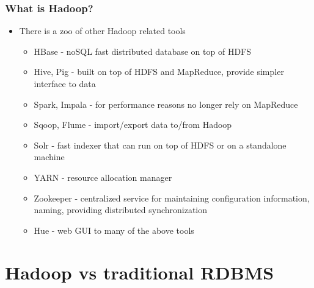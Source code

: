 \documentclass{beamer}
\begin{document}
\begin{frame}
  \frametitle{What is Hadoop?}
  \begin{itemize}
  \item There is a zoo of other Hadoop related tools
    \begin{itemize}
    \item {\color{mycolordef}HBase} - noSQL fast distributed database on top of HDFS
    \item {\color{mycolordef}Hive, Pig}  -  built on top of HDFS and MapReduce, provide simpler interface to data
    \item {\color{mycolordef}Spark, Impala} - for performance reasons no longer rely on MapReduce
    \item {\color{mycolordef}Sqoop, Flume} - import/export data to/from Hadoop
    \item {\color{mycolordef}Solr} - fast indexer that can run on top of HDFS or on a standalone machine
    \item {\color{mycolordef}YARN} - resource allocation manager
    \item {\color{mycolordef}Zookeeper} - centralized service for maintaining configuration information, naming, providing distributed synchronization
    \item {\color{mycolordef}Hue} - web GUI to many of the above tools
    \end{itemize}
  \end{itemize}
\end{frame}

\section{Hadoop vs traditional RDBMS}
\end{document}
